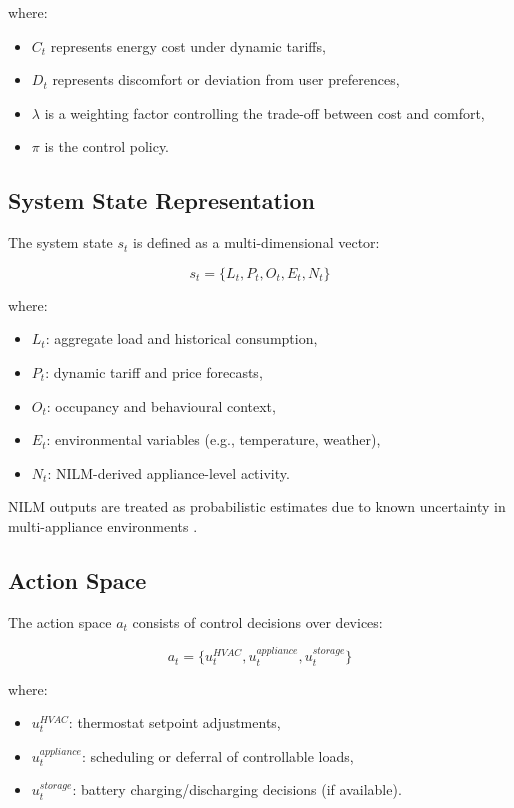 \documentclass[11pt,a4paper]{article}
\begin{document}
where:
\begin{itemize}
    \item $C_t$ represents energy cost under dynamic tariffs,
    \item $D_t$ represents discomfort or deviation from user preferences,
    \item $\lambda$ is a weighting factor controlling the trade-off between cost and comfort,
    \item $\pi$ is the control policy.
\end{itemize}

\subsection{System State Representation}

The system state $s_t$ is defined as a multi-dimensional vector:

$$
s_t = \{ L_t, P_t, O_t, E_t, N_t \}
$$

where:
\begin{itemize}
    \item $L_t$: aggregate load and historical consumption,
    \item $P_t$: dynamic tariff and price forecasts,
    \item $O_t$: occupancy and behavioural context,
    \item $E_t$: environmental variables (e.g., temperature, weather),
    \item $N_t$: NILM-derived appliance-level activity.
\end{itemize}

NILM outputs are treated as probabilistic estimates due to known uncertainty in multi-appliance environments \cite{tang2023nilm}.

\subsection{Action Space}

The action space $a_t$ consists of control decisions over devices:

$$
a_t = \{ u^{HVAC}_t, u^{appliance}_t, u^{storage}_t \}
$$

where:
\begin{itemize}
    \item $u^{HVAC}_t$: thermostat setpoint adjustments,
    \item $u^{appliance}_t$: scheduling or deferral of controllable loads,
    \item $u^{storage}_t$: battery charging/discharging decisions (if available).
\end{itemize}
\end{document}
